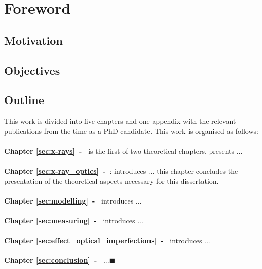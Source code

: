 \chapter*{Foreword}


\section*{Motivation}



\section*{Objectives}


\section*{Outline}

This work is divided into five chapters and one appendix with the relevant publications from the time as a PhD candidate. This work is organised as follows:
\\
\\
\textbf{Chapter \ref{sec:x-rays}~-~} is the first of two theoretical chapters, presents ...
\\
\\
\textbf{Chapter \ref{sec:x-ray_optics}~-~}: introduces ... this chapter concludes the presentation of the theoretical aspects necessary for this dissertation.
\\
\\
\textbf{Chapter \ref{sec:modelling}~-~} introduces ...
\\
\\
\textbf{Chapter \ref{sec:measuring}~-~} introduces ...
\\
\\
\textbf{Chapter \ref{sec:effect_optical_imperfections}~-~} introduces ...
\\
\\
\textbf{Chapter \ref{sec:conclusion}~-~}  ...$\blacksquare$